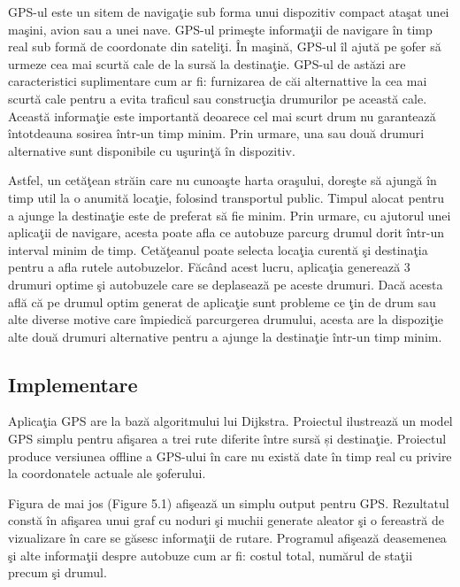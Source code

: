 \documentclass[11pt,a4paper]{report}
\begin{document}
    \vspace{0.2cm} GPS-ul este un sitem de naviga\c tie  sub forma unui dispozitiv compact ata\c sat unei ma\c sini, avion sau a unei nave. GPS-ul prime\c ste informa\c tii de navigare \^ in timp real sub form\u a de coordonate din sateli\c ti.  \^ In ma\c sin\u a, GPS-ul \^ il ajut\u a pe \c sofer s\u a urmeze cea mai scurt\u a cale de la surs\u a la destina\c tie. GPS-ul de ast\u azi are caracteristici suplimentare cum ar fi: furnizarea de c\u ai alternattive la cea mai scurt\u a cale pentru a evita traficul sau construc\c tia drumurilor pe aceast\u a cale. Aceast\u a informa\c tie este important\u a deoarece cel mai scurt drum nu garanteaz\u a \^ intotdeauna sosirea \^ intr-un timp minim. Prin urmare, una sau dou\u a drumuri alternative sunt disponibile cu u\c surin\c t\u a \^ in dispozitiv.
    
    Astfel, un cet\u a\c tean str\u ain care nu cunoa\c ste harta ora\c sului, dore\c ste  s\u a ajung\u a \^ in timp util la o anumit\u a loca\c tie, folosind transportul public. Timpul alocat pentru a ajunge la destina\c tie este de preferat s\u a fie minim. Prin urmare, cu ajutorul unei aplica\c tii de navigare, acesta poate afla ce autobuze parcurg drumul dorit \^ intr-un interval minim de timp. Cet\u a\c teanul poate selecta loca\c tia curent\u a \c si destina\c tia pentru a afla rutele autobuzelor. F\u ac\^ and acest lucru, aplica\c tia genereaz\u a 3 drumuri optime \c si autobuzele care se deplaseaz\u a pe aceste drumuri. Dac\u a acesta afl\u a c\u a pe drumul optim generat de aplica\c tie sunt probleme ce \c tin de drum sau alte diverse motive care \^ impiedic\u a parcurgerea drumului, acesta are la dispozi\c tie alte dou\u a drumuri alternative pentru a ajunge la destina\c tie \^ intr-un timp minim.
     \subsection*{Implementare}
     
     
     Aplica\c tia GPS are la baz\u a algoritmului lui Dijkstra. Proiectul ilustreaz\u a un model GPS simplu
     pentru afi\c sarea a trei rute diferite \^ intre surs\u a și  destina\c tie. Proiectul
     produce versiunea offline a GPS-ului în care nu există date în timp real cu privire la coordonatele actuale ale
     \c soferului.
     
     Figura de mai jos (Figure 5.1) afi\c seaz\u a un simplu output pentru GPS. Rezultatul const\u a \^ in afi\c sarea unui graf cu noduri \c si muchii generate aleator \c si o fereastr\u a de vizualizare  \^ in care se g\u asesc informa\c tii de rutare. Programul afi\c seaz\u a deasemenea \c si alte informa\c tii despre autobuze cum ar fi: costul total, num\u arul de sta\c tii precum  \c si  drumul.
     
\end{document}
